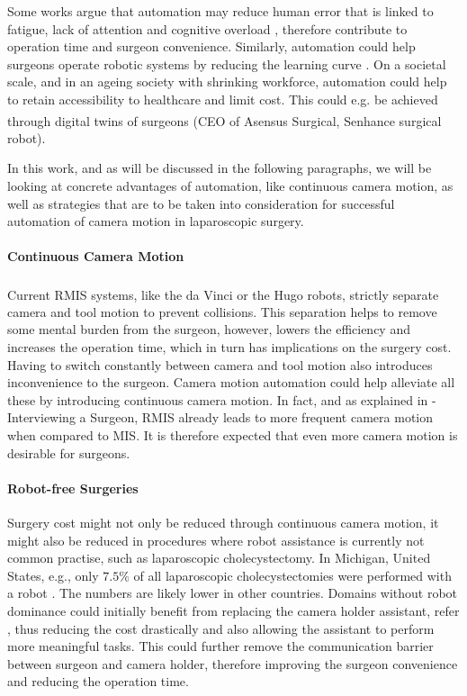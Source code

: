 Some works argue that automation may reduce human error that is linked to fatigue, lack of attention and cognitive overload \cite{fiorini2022concepts}, therefore contribute to operation time and surgeon convenience. Similarly, automation could help surgeons operate robotic systems by reducing the learning curve \cite{van2018learning}. On a societal scale, and in an ageing society with shrinking workforce, automation could help to retain accessibility to healthcare and limit cost. This could e.g. be achieved through digital twins of surgeons \cite{zidane2023robotics} (CEO of Asensus Surgical, Senhance\textsuperscript{\texttrademark} surgical robot).

In this work, and as will be discussed in the following paragraphs, we will be looking at concrete advantages of automation, like continuous camera motion, as well as strategies that are to be taken into consideration for successful automation of camera motion in laparoscopic surgery.


\paragraph{Continuous Camera Motion} Current RMIS systems, like the da Vinci\textsuperscript{\textregistered} or the Hugo\textsuperscript{\texttrademark} robots, strictly separate camera and tool motion to prevent collisions. This separation helps to remove some mental burden from the surgeon, however, lowers the efficiency and increases the operation time, which in turn has implications on the surgery cost. Having to switch constantly between camera and tool motion also introduces inconvenience to the surgeon. Camera motion automation could help alleviate all these by introducing continuous camera motion. In fact, and as explained in  - Interviewing a Surgeon, RMIS already leads to more frequent camera motion when compared to MIS. It is therefore expected that even more camera motion is desirable for surgeons.

\paragraph{Robot-free Surgeries} Surgery cost might not only be reduced through continuous camera motion, it might also be reduced in procedures where robot assistance is currently not common practise, such as laparoscopic cholecystectomy. In Michigan, United States, e.g., only $7.5\%$ of all laparoscopic cholecystectomies were performed with a robot \cite{sheetz2020trends}. The numbers are likely lower in other countries. Domains without robot dominance could initially benefit from replacing the camera holder assistant, refer , thus reducing the cost drastically and also allowing the assistant to perform more meaningful tasks. This could further remove the communication barrier between surgeon and camera holder, therefore improving the surgeon convenience and reducing the operation time. 

